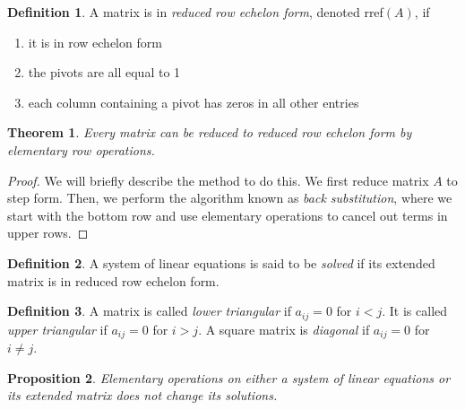\documentclass{article}
\newtheorem{theorem}{Theorem}[section]
\newtheorem{proposition}[theorem]{Proposition}
\theoremstyle{remark}
\theoremstyle{definition}
\newtheorem{definition}{Definition}[section]
\begin{document}
\begin{definition}
A matrix is in \textit{reduced row echelon form}, denoted rref$(A)$, if
\begin{enumerate}
    \item it is in row echelon form
    \item the pivots are all equal to 1
    \item each column containing a pivot has zeros in all other entries
\end{enumerate}
\end{definition}

\begin{theorem}
Every matrix can be reduced to reduced row echelon form by elementary row operations. 
\end{theorem}

\begin{proof}
We will briefly describe the method to do this. We first reduce matrix $A$ to step form. Then, we perform the algorithm known as \textit{back substitution}, where we start with the bottom row and use elementary operations to cancel out terms in upper rows. 
\end{proof}

\begin{definition}
A system of linear equations is said to be \textit{solved} if its extended matrix is in reduced row echelon form. 
\end{definition}

\begin{definition}
A matrix is called \textit{lower triangular} if $a_{i j} = 0$ for $i < j$. It is called \textit{upper triangular} if $a_{i j} = 0$ for $i > j$. A square matrix is \textit{diagonal} if $a_{i j} = 0$ for $i \neq j$. 
\end{definition}

\begin{proposition}
Elementary operations on either a system of linear equations or its extended matrix does not change its solutions. 
\end{proposition}
\end{document}
